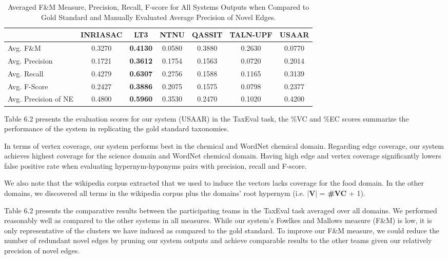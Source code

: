 \begin{table}[H]
\small
\centering
    \begin{tabular}{l|ccccc|c}
             & \textbf{INRIASAC} & \textbf{LT3}    & \textbf{NTNU}   & \textbf{QASSIT} & \textbf{TALN-UPF} & \textbf{USAAR} \\ \hline
    Avg. F\&M & 0.3270 & \textbf{0.4130} & 0.0580 & 0.3880 & 0.2630 & 0.0770 \\
    Avg. Precision   & 0.1721   & \textbf{0.3612} & 0.1754 & 0.1563 & 0.0720    & 0.2014    \\
    Avg. Recall   & 0.4279   & \textbf{0.6307} & 0.2756 & 0.1588 & 0.1165   & 0.3139    \\
    Avg. F-Score   & 0.2427   & \textbf{0.3886} & 0.2075 & 0.1575 & 0.0798   & 0.2377    \\
   Avg. Precision of NE & 0.4800    & \textbf{0.5960}  & 0.3530  & 0.2470  & 0.1020    & 0.4200     \\
    \end{tabular}
    \caption{Averaged F\&M Measure, Precision, Recall, F-score for All Systems Outputs when Compared to Gold Standard and Manually Evaluated Average Precision of Novel Edges.}
\end{table}

Table 6.2 presents the evaluation scores for our system (USAAR) in the TaxEval task, the \%VC and \%EC scores summarize the performance of the system in replicating the gold standard taxonomies. 

In terms of vertex coverage, our system performs best in the chemical and WordNet chemical domain. Regarding edge coverage, our system achieves highest coverage for the science domain and WordNet chemical domain. Having high edge and vertex coverage significantly lowers false positive rate when evaluating hypernym-hyponyms pairs with precision, recall and F-score. 

We also note that the wikipedia corpus extracted that we used to induce the vectors lacks coverage for the food domain. In the other domains, we discovered all terms in the wikipedia corpus plus the domains' root hypernym (i.e. \textbf{$\vert$V$\vert$} = \textbf{\#VC} + 1).

Table 6.2 presents the comparative results between the participating teams in the TaxEval task averaged over all domains. We performed reasonably well as compared to the other systems in all measures. While our system's Fowlkes and Mallows measure (F\&M) is low, it is only representative of the clusters we have induced as compared to the gold standard. To improve our F\&M measure, we could reduce the number of redundant novel edges by pruning our system outputs and achieve comparable results to the other teams given our relatively precision of novel edges.

